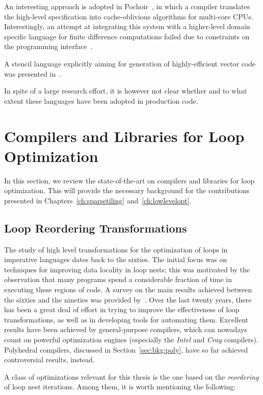 An interesting approach is adopted in Pochoir~\citep{pochoir}, in which a compiler translates the high-level specification into cache-oblivious algorithms for multi-core CPUs. Interestingly, an attempt at integrating this system with a higher-level domain specific language for finite difference computations failed due to constraints on the programming interface~\citep{tj-thesis}. 

A stencil language explicitly aiming for generation of highly-efficient vector code was presented in~\cite{stencil-compiler}.

In spite of a large research effort, it is however not clear whether and to what extent these languages have been adopted in production code. 


\section{Compilers and Libraries for Loop Optimization}
\label{sec:bkg:codeopt}
In this section, we review the state-of-the-art on compilers and libraries for loop optimization. This will provide the necessary background for the contributions presented in Chapters~\ref{ch:sparsetiling} and~\ref{ch:lowlevelopt}.

\subsection{Loop Reordering Transformations}
\label{sec:bkg:loop-transf}
The study of high level transformations for the optimization of loops in imperative languages dates back to the sixties. The initial focus was on techniques for improving data locality in loop nests; this was motivated by the observation that many programs spend a considerable fraction of time in executing these regions of code. A survey on the main results achieved between the sixties and the nineties was provided by~\cite{bacon-comp-transf}. Over the last twenty years, there has been a great deal of effort in trying to improve the effectiveness of loop transformations, as well as in developing tools for automating them. Excellent results have been achieved by general-purpose compilers, which can nowadays count on powerful optimization engines (especially the {\em Intel} and {\em Cray} compilers). Polyhedral compilers, discussed in Section~\ref{sec:bkg:poly}, have so far achieved controversial results, instead.

A class of optimizations relevant for this thesis is the one based on the {\em reordering} of loop nest iterations. Among them, it is worth mentioning the following:

